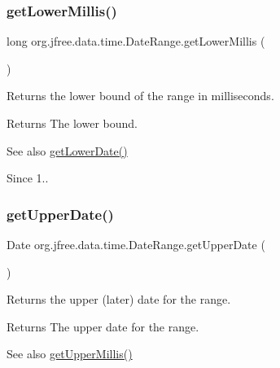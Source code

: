 \subsubsection{\texorpdfstring{get\+Lower\+Millis()}{getLowerMillis()}}
{\footnotesize\ttfamily long org.\+jfree.\+data.\+time.\+Date\+Range.\+get\+Lower\+Millis (\begin{DoxyParamCaption}{ }\end{DoxyParamCaption})}

Returns the lower bound of the range in milliseconds.

\begin{DoxyReturn}{Returns}
The lower bound.
\end{DoxyReturn}
\begin{DoxySeeAlso}{See also}
\mbox{\hyperlink{classorg_1_1jfree_1_1data_1_1time_1_1_date_range_a81157ae9e57975ecb7e167ba7678ff97}{get\+Lower\+Date()}}
\end{DoxySeeAlso}
\begin{DoxySince}{Since}
1.. 
\end{DoxySince}
\mbox{\label{classorg_1_1jfree_1_1data_1_1time_1_1_date_range_a9b87175cf0549cce3e213c8041e174f8}} 
\subsubsection{\texorpdfstring{get\+Upper\+Date()}{getUpperDate()}}
{\footnotesize\ttfamily Date org.\+jfree.\+data.\+time.\+Date\+Range.\+get\+Upper\+Date (\begin{DoxyParamCaption}{ }\end{DoxyParamCaption})}

Returns the upper (later) date for the range.

\begin{DoxyReturn}{Returns}
The upper date for the range.
\end{DoxyReturn}
\begin{DoxySeeAlso}{See also}
\mbox{\hyperlink{classorg_1_1jfree_1_1data_1_1time_1_1_date_range_a1b32b3932522d445ff0942baa23f1abb}{get\+Upper\+Millis()}} 
\end{DoxySeeAlso}
\mbox{\label{classorg_1_1jfree_1_1data_1_1time_1_1_date_range_a1b32b3932522d445ff0942baa23f1abb}} 
